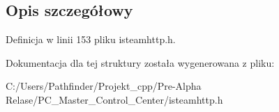 \subsection{Opis szczegółowy}


Definicja w linii 153 pliku isteamhttp.\+h.



Dokumentacja dla tej struktury została wygenerowana z pliku\+:\begin{DoxyCompactItemize}
\item 
C\+:/\+Users/\+Pathfinder/\+Projekt\+\_\+cpp/\+Pre-\/\+Alpha Relase/\+P\+C\+\_\+\+Master\+\_\+\+Control\+\_\+\+Center/isteamhttp.\+h\end{DoxyCompactItemize}
